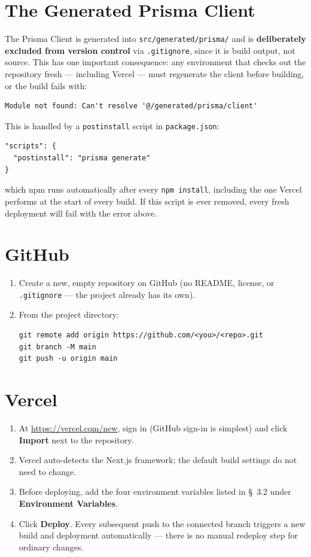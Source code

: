 \documentclass[11pt,a4paper]{article}
\begin{document}
\section{The Generated Prisma Client}
The Prisma Client is generated into \texttt{src/generated/prisma/} and is
\textbf{deliberately excluded from version control} via \texttt{.gitignore}, since it
is build output, not source. This has one important consequence: any environment that
checks out the repository fresh --- including Vercel --- must regenerate the client
before building, or the build fails with:
\begin{lstlisting}
Module not found: Can't resolve '@/generated/prisma/client'
\end{lstlisting}
This is handled by a \texttt{postinstall} script in \texttt{package.json}:
\begin{lstlisting}
"scripts": {
  "postinstall": "prisma generate"
}
\end{lstlisting}
which npm runs automatically after every \texttt{npm install}, including the one
Vercel performs at the start of every build. If this script is ever removed, every
fresh deployment will fail with the error above.

\section{GitHub}
\begin{enumerate}[leftmargin=*]
  \item Create a new, empty repository on GitHub (no README, license, or
        \texttt{.gitignore} --- the project already has its own).
  \item From the project directory:
\begin{lstlisting}
git remote add origin https://github.com/<you>/<repo>.git
git branch -M main
git push -u origin main
\end{lstlisting}
\end{enumerate}

\section{Vercel}
\begin{enumerate}[leftmargin=*]
  \item At \url{https://vercel.com/new}, sign in (GitHub sign-in is simplest) and click
        \textbf{Import} next to the repository.
  \item Vercel auto-detects the Next.js framework; the default build settings do not
        need to change.
  \item Before deploying, add the four environment variables listed in
        \S~3.2 under \textbf{Environment Variables}.
  \item Click \textbf{Deploy}. Every subsequent push to the connected branch triggers a
        new build and deployment automatically --- there is no manual redeploy step for
        ordinary changes.
\end{enumerate}
\end{document}
